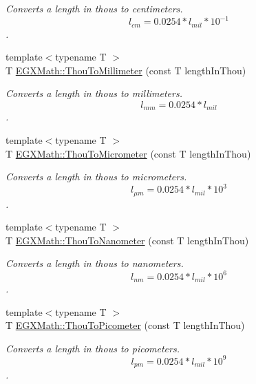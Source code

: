 \begin{DoxyCompactItemize}
\begin{DoxyCompactList}\small\item\em Converts a length in thous to centimeters. \[ l_{cm}=0.0254 * l_{mil} * 10^{-1} \]. \end{DoxyCompactList}\item 
{\footnotesize template$<$typename T $>$ }\\T \mbox{\hyperlink{group___e_g_x_math-_conversions-_length_conversions-_imperial-_thou-_s_i_ga0fc7339abd95e8c5abaed9fee95bafbb}{E\+G\+X\+Math\+::\+Thou\+To\+Millimeter}} (const T length\+In\+Thou)
\begin{DoxyCompactList}\small\item\em Converts a length in thous to millimeters. \[ l_{mm}=0.0254 * l_{mil} \]. \end{DoxyCompactList}\item 
{\footnotesize template$<$typename T $>$ }\\T \mbox{\hyperlink{group___e_g_x_math-_conversions-_length_conversions-_imperial-_thou-_s_i_gaa3207ca1334f385f584132c109345a6d}{E\+G\+X\+Math\+::\+Thou\+To\+Micrometer}} (const T length\+In\+Thou)
\begin{DoxyCompactList}\small\item\em Converts a length in thous to micrometers. \[ l_{\mu m}=0.0254 * l_{mil} * 10^{3} \]. \end{DoxyCompactList}\item 
{\footnotesize template$<$typename T $>$ }\\T \mbox{\hyperlink{group___e_g_x_math-_conversions-_length_conversions-_imperial-_thou-_s_i_gadc6f45eeae7d4fe8bb993419c96e1860}{E\+G\+X\+Math\+::\+Thou\+To\+Nanometer}} (const T length\+In\+Thou)
\begin{DoxyCompactList}\small\item\em Converts a length in thous to nanometers. \[ l_{nm}=0.0254 * l_{mil} * 10^{6} \]. \end{DoxyCompactList}\item 
{\footnotesize template$<$typename T $>$ }\\T \mbox{\hyperlink{group___e_g_x_math-_conversions-_length_conversions-_imperial-_thou-_s_i_gabc7a92b07f617bdf0ac0249d34c4aa4c}{E\+G\+X\+Math\+::\+Thou\+To\+Picometer}} (const T length\+In\+Thou)
\begin{DoxyCompactList}\small\item\em Converts a length in thous to picometers. \[ l_{pm}=0.0254 * l_{mil} * 10^{9} \]. \end{DoxyCompactList}\item 

\end{DoxyCompactItemize}

